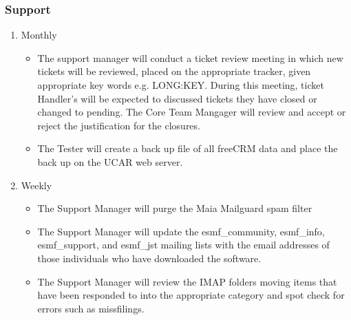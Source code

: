 \subsubsection{Support}
\begin{enumerate}
\item Monthly
  \begin{itemize}
  \item The support manager will conduct a ticket review meeting in which new tickets will be reviewed, placed on the appropriate tracker, given appropriate key words e.g. LONG:KEY. During this meeting, ticket Handler's will be expected to discussed tickets they have closed or changed to pending. The Core Team Mangager will review and accept or reject the justification for the closures.
   \item The Tester will create a back up file of all freeCRM data and place the back up on the UCAR web server.
  \end{itemize}

\item Weekly
  \begin{itemize}
  \item The Support Manager will purge the Maia Mailguard spam filter
  \item The Support Manager will update the esmf\_community, esmf\_info, esmf\_support, and esmf\_jst mailing lists with the email addresses of those individuals who have downloaded the software.
  \item The Support Manager will review the IMAP folders moving items that have been responded to into the appropriate category and spot check for errors such as missfilings.
  \end{itemize}

\end{enumerate}  
 

